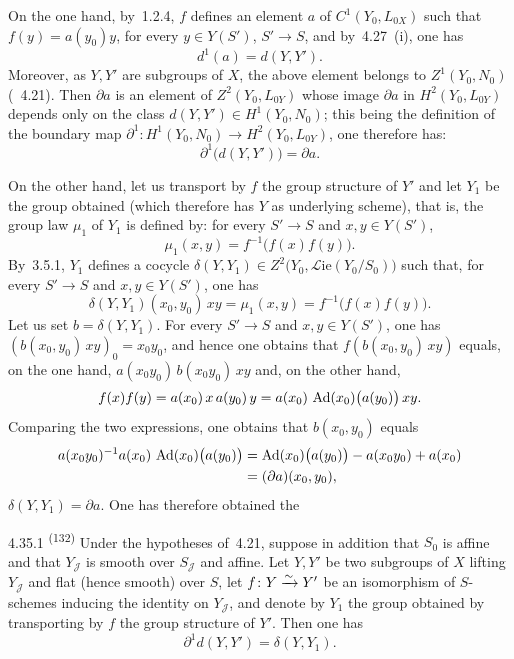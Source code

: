 On the one hand, by~1.2.4, \(f\) defines an element \(a\) of
\(C^{1}(Y_0,L_{0X})\) such that \(f(y)=a(y_0)y\), for every
\(y\in Y(S')\), \(S'\to S\), and by~4.27~(i), one has
\[
d^{1}(a)=d(Y,Y').
\]
Moreover, as \(Y,Y'\) are subgroups of \(X\), the above element belongs to
\(Z^{1}(Y_0,N_0)\) (\cf~4.21). Then \(\partial a\) is an element of
\(Z^{2}(Y_0,L_{0Y})\) whose image \(\partial a\) in \(H^{2}(Y_0,L_{0Y})\)
depends only on the class \(d(Y,Y')\in H^{1}(Y_0,N_0)\); this being the
definition of the boundary map
\(\partial^{1}\colon H^{1}(Y_0,N_0)\to H^{2}(Y_0,L_{0Y})\), one therefore
has:
\[
\partial^{1}\bigl(d(Y,Y')\bigr)=\partial a.
\]

On the other hand, let us transport by \(f\) the group structure of
\(Y'\) and let \(Y_1\) be the group obtained (which therefore has \(Y\) as
underlying scheme), that is, the group law \(\mu_1\) of \(Y_1\) is defined
by: for every \(S'\to S\) and \(x,y\in Y(S')\),
\[
\mu_1(x,y)=f^{-1}\bigl(f(x)f(y)\bigr).
\]
By~3.5.1, \(Y_1\) defines a cocycle
\(\delta(Y,Y_1)\in Z^{2}\bigl(Y_0,\mathcal{L}\mathrm{ie}(Y_0/S_0)\bigr)\)
such that, for every \(S'\to S\) and \(x,y\in Y(S')\), one has
\[
\delta(Y,Y_1)(x_0,y_0)\,xy=\mu_1(x,y)=f^{-1}\bigl(f(x)f(y)\bigr).
\]
Let us set \(b=\delta(Y,Y_1)\). For every \(S'\to S\) and
\(x,y\in Y(S')\), one has \((b(x_0,y_0)\,xy)_0=x_0y_0\), and hence one
obtains that \(f(b(x_0,y_0)\,xy)\) equals, on the one hand,
\(a(x_0y_0)\,b(x_0y_0)\,xy\) and, on the other hand,
\[
f(x)f(y)=a(x_0)\,x\,a(y_0)\,y=a(x_0)\,\operatorname{Ad}(x_0)\bigl(a(y_0)\bigr)\,xy.
\]
Comparing the two expressions, one obtains that \(b(x_0,y_0)\) equals
\begin{align*}
a(x_0y_0)^{-1}a(x_0)\,\operatorname{Ad}(x_0)\bigl(a(y_0)\bigr)
&=\operatorname{Ad}(x_0)\bigl(a(y_0)\bigr)-a(x_0y_0)+a(x_0)\\
&=(\partial a)(x_0,y_0),
\end{align*}
\ie \(\delta(Y,Y_1)=\partial a\). One has therefore obtained the

\begin{proposition}{4.35.1}
\label{III.4.35.1}
\textsuperscript{(132)}
Under the hypotheses of~4.21, suppose in addition that \(S_0\) is affine
and that \(Y_{\mathcal{J}}\) is smooth over \(S_{\mathcal{J}}\) and
affine. Let \(Y,Y'\) be two subgroups of \(X\) lifting \(Y_{\mathcal{J}}\)
and flat (hence smooth) over \(S\), let \(f\colon Y\xrightarrow{\sim} Y'\) be an
isomorphism of \(S\)-schemes inducing the identity on \(Y_{\mathcal{J}}\),
and denote by \(Y_1\) the group obtained by transporting by \(f\) the group
structure of \(Y'\). Then one has
\[
\partial^{1}d(Y,Y')=\delta(Y,Y_1).
\]
\end{proposition}

